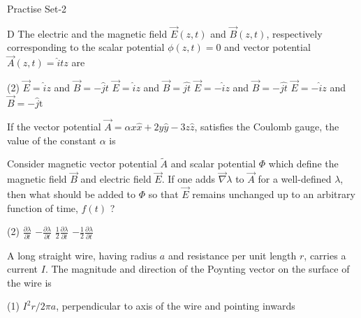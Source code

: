 \newpage
\begin{abox}
	Practise Set-2
\end{abox}
\begin{enumerate}
	\begin{minipage}{\textwidth}
		\item  D The electric and the magnetic field $\vec{E}(z, t)$ and $\vec{B}(z, t)$, respectively corresponding to the scalar potential $\phi(z, t)=0$ and vector potential $\vec{A}(z, t)=\hat{i} t z$ are
	\end{minipage}
	\begin{tasks}(2)
		\task[\textbf{A.}] $\vec{E}=\hat{i} z$ and $\vec{B}=-\hat{j} t$
		\task[\textbf{B.}]$\vec{E}=\hat{i} z$ and $\vec{B}=\hat{j t}$
		\task[\textbf{C.}]$\vec{E}=-\hat{i} z$ and $\vec{B}=-\hat{j t}$
		\task[\textbf{D.}]$\vec{E}=-\hat{i} z$ and $\vec{B}=-\hat{j} \mathrm{t}$
	\end{tasks}
	\begin{minipage}{\textwidth}
		\item If the vector potential $\vec{A}=\alpha x \hat{x}+2 y \hat{y}-3 z \hat{z}$, satisfies the Coulomb gauge, the value of the constant $\alpha$ is
	\end{minipage}
	\begin{minipage}{\textwidth}
		\item Consider magnetic vector potential $\tilde{A}$ and scalar potential $\Phi$ which define the magnetic field $\vec{B}$ and electric field $\vec{E}$. If one adds $\vec{\nabla} \lambda$ to $\vec{A}$ for a well-defined $\lambda$, then what should be added to $\Phi$ so that $\vec{E}$ remains unchanged up to an arbitrary function of time, $f(t)$ ?
	\end{minipage}
	\begin{tasks}(2)
		\task[\textbf{A.}] $\frac{\partial \lambda}{\partial t}$
		\task[\textbf{B.}]$-\frac{\partial \lambda}{\partial t}$
		\task[\textbf{C.}]$\frac{1}{2} \frac{\partial \lambda}{\partial t}$
		\task[\textbf{D.}]$-\frac{1}{2} \frac{\partial \lambda}{\partial t}$
	\end{tasks}
	\item A long straight wire, having radius $a$ and resistance per unit length $r$, carries a current $I$. The magnitude and direction of the Poynting vector on the surface of the wire is
	{}
	\begin{tasks}(1)
		\task[\textbf{A.}] $I^{2} r / 2 \pi a$, perpendicular to axis of the wire and pointing inwards

\end{tasks}
\end{enumerate}
